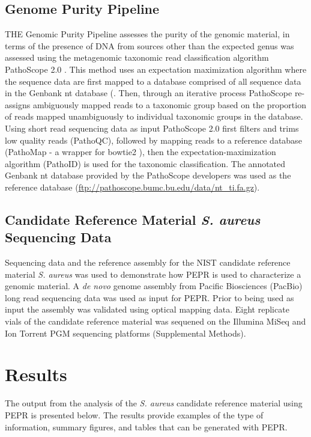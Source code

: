 \documentclass[smallextended]{svjour3}\usepackage[]{graphicx}\usepackage[]{color}
\begin{document}
\subsection{Genome Purity Pipeline}
\label{method:4}
THE Genomic Purity Pipeline assesses the purity of the genomic material, in terms of the presence of DNA from sources other than the expected genus was assessed using the metagenomic taxonomic read classification algorithm PathoScope 2.0 \cite{Hong2014}.  This method uses an expectation maximization algorithm where the sequence data are first mapped to a database comprised of all sequence data in the Genbank nt database (. Then, through an iterative process PathoScope re-assigns ambiguously mapped reads to a taxonomic group based on the proportion of reads mapped unambiguously to individual taxonomic groups in the database. Using short read sequencing data as input PathoScope 2.0 first filters and trims low quality reads (PathoQC), followed by mapping reads to a reference database (PathoMap - a wrapper for bowtie2 \cite{Langmead2012}), then the expectation-maximization algorithm (PathoID) is used for the taxonomic classification.  The annotated Genbank nt database provided by the PathoScope developers was used as the reference database (\url{ftp://pathoscope.bumc.bu.edu/data/nt_ti.fa.gz}). 

\subsection{Candidate Reference Material \textit{S. aureus} Sequencing Data}
Sequencing data and the reference assembly for the NIST candidate reference material \textit{S. aureus} was used to demonstrate how PEPR is used to characterize a genomic material.  A \textit{de novo} genome assembly from Pacific Biosciences (PacBio) long read sequencing data was used as input for PEPR.  Prior to being used as input the assembly was validated using optical mapping data.  Eight replicate vials of the candidate reference material was sequened on the Illumina MiSeq and Ion Torrent PGM sequencing platforms (Supplemental Methods).

\section{Results}
The output from the analysis of the \textit{S. aureus} candidate reference material using PEPR is presented below. The results provide examples of the type of information, summary figures, and tables that can be generated with PEPR.
\end{document}
